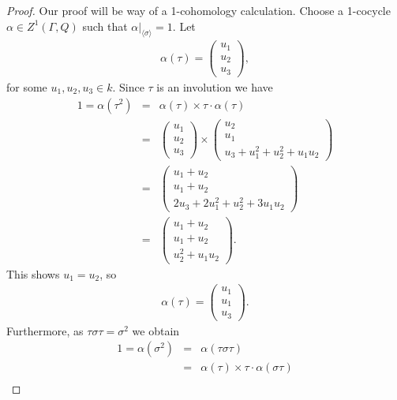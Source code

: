 \begin{proof}
	Our proof will be way of a 1-cohomology calculation. Choose a 1-cocycle $\alpha \in Z^1(\Gamma, Q)$ such that $\alpha|_{\langle \sigma \rangle} = 1$. Let
	\begin{eqnarray*}
		\alpha(\tau) = \left(\begin{matrix} u_1 \\ u_2 \\ u_3 \end{matrix} \right),
	\end{eqnarray*}
	for some $u_1, u_2, u_3 \in k$. Since $\tau$ is an involution we have
	\begin{eqnarray*}
		1 = \alpha(\tau^2) &=& \alpha(\tau) \times \tau\cdot\alpha(\tau)\\
		&=& \left(\begin{matrix} u_1 \\ u_2 \\ u_3\end{matrix} \right) \times 
		\left(\begin{matrix} u_2 \\ u_1 \\ u_3 + u_1^2 + u_2^2 + u_1u_2\end{matrix} \right) \\
		&=& \left(\begin{matrix} u_1 + u_2 \\ u_1 + u_2 \\ 2u_3 + 2u_1^2 + u_2^2 + 3u_1u_2\end{matrix} \right)\\
		&=& \left(\begin{matrix} u_1 + u_2 \\ u_1 + u_2 \\ u_2^2 + u_1u_2\end{matrix} \right).
	\end{eqnarray*}
	This shows $u_1 = u_2$, so
	\begin{eqnarray*}
		\alpha(\tau) = \left(\begin{matrix} u_1 \\ u_1 \\ u_3\end{matrix} \right).
	\end{eqnarray*}
	Furthermore, as $\tau\sigma\tau = \sigma^2$ we obtain
	\begin{eqnarray*}
		1 = \alpha(\sigma^2) &=& \alpha(\tau\sigma\tau) \\
		&=& \alpha(\tau) \times \tau\cdot\alpha(\sigma\tau)\\

\end{eqnarray*}
\end{proof}
